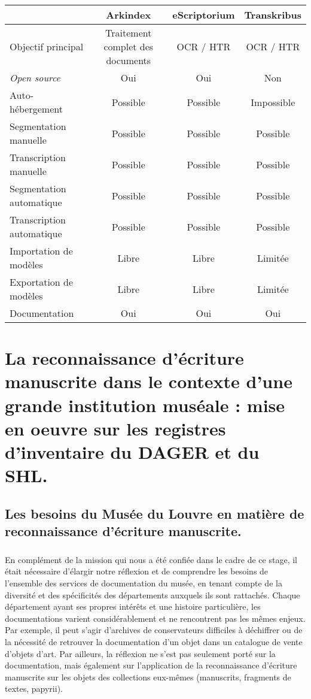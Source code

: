 \documentclass[a4paper,12pt,twoside]{book}
\begin{document}
\begin{center}
	\begin{tabular}{|l|c|c|c|}
		\hline
		\textbf{} & \textbf{Arkindex} & \textbf{eScriptorium} & \textbf{Transkribus} \\
		\hline	
		Objectif principal & Traitement complet des documents & OCR / HTR & OCR / HTR \\
		\hline
		\textit{Open source} & Oui  & Oui  & Non  \\
		\hline
		Auto-hébergement  & Possible & Possible & Impossible  \\
		\hline
		Segmentation manuelle & Possible  & Possible & Possible \\
		\hline
		Transcription manuelle & Possible & Possible & Possible \\
		\hline
		Segmentation automatique & Possible & Possible & Possible \\
		\hline
		Transcription automatique & Possible & Possible & Possible \\
		\hline
		Importation de modèles & Libre  & Libre & Limitée \\
		\hline
		Exportation de modèles & Libre & Libre & Limitée \\
		\hline
		Documentation & Oui & Oui & Oui \\
		\hline
	\end{tabular}
\end{center}





\chapter{La reconnaissance d'écriture manuscrite dans le contexte d'une grande institution muséale : mise en oeuvre sur les registres d'inventaire du DAGER et du SHL.}

\section{Les besoins du Musée du Louvre en matière de reconnaissance d’écriture manuscrite.}


\paragraph{}
En complément de la mission qui nous a été confiée dans le cadre de ce stage, il était nécessaire d’élargir notre réflexion et de comprendre les besoins de l’ensemble des services de documentation du musée, en tenant compte de la diversité et des spécificités des départements auxquels ils sont rattachés. Chaque département ayant ses propres intérêts et une histoire particulière, les documentations varient considérablement et ne rencontrent pas les mêmes enjeux. Par exemple, il peut s’agir d’archives de conservateurs difficiles à déchiffrer ou de la nécessité de retrouver la documentation d’un objet dans un catalogue de vente d’objets d’art. Par ailleurs, la réflexion ne s’est pas seulement porté sur la documentation, mais également sur l’application de la reconnaissance d’écriture manuscrite sur les objets des collections eux-mêmes (manuscrits, fragments de textes, papyrii). 
\end{document}
